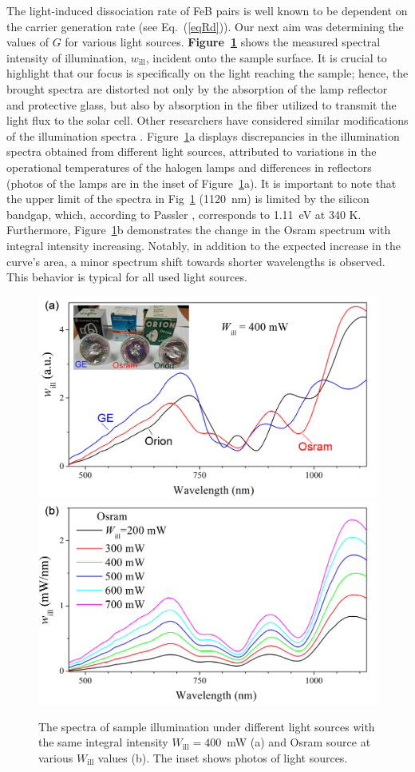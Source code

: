 \documentclass{WileyMSP-template}
\begin{document}
The light-induced dissociation rate of FeB pairs is well known
to be dependent on the carrier generation rate (see Eq.~(\ref{eqRd})).
Our next aim was determining the values of $G$ for various light sources.
\textbf{Figure~\ref{fig4}} shows the measured spectral intensity of illumination, $w_\mathrm{ill}$, incident onto the sample surface.
It is crucial to highlight that our focus is specifically on the light reaching the sample;
hence, the brought spectra are distorted not only by the absorption of the lamp reflector and protective glass, but also by absorption in the fiber
utilized to transmit the light flux to the solar cell.
Other researchers have considered similar modifications of the illumination spectra \cite{Libra2017}.
Figure~\ref{fig4}a displays discrepancies in the illumination spectra obtained from different light sources,
attributed to variations in the operational temperatures of the halogen lamps and differences in reflectors
(photos of the lamps are in the inset of Figure~\ref{fig4}a).
It is important to note that the upper limit of the spectra in Fig~\ref{fig4} (1120~nm)
is limited by the silicon bandgap, which, according to Passler \cite{Pasler}, corresponds to 1.11~eV at 340 K.
Furthermore, Figure~\ref{fig4}b demonstrates the change in the Osram spectrum with integral intensity increasing.
Notably, in addition to the expected increase in the curve's area, a minor spectrum shift towards shorter wavelengths is observed.
This behavior is typical for all used light sources.


\begin{figure}
\centering
  \includegraphics[width=0.4\linewidth]{Fig4a.png}
  \includegraphics[width=0.4\linewidth]{Fig4b.png}
  \caption{
  The spectra of sample illumination under different light sources with the same integral intensity $W_\mathrm{ill}=400$~mW (a) and Osram source at various $W_\mathrm{ill}$ values (b).
 The inset shows photos of light sources.
}
  \label{fig4}
\end{figure}
\end{document}
